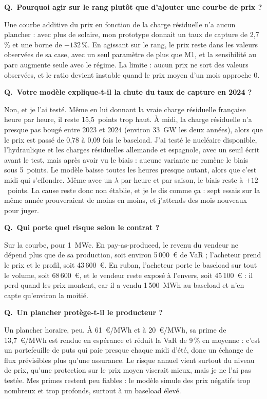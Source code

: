\documentclass[11pt,a4paper]{article}
\newcounter{qr}
\newcommand{\qr}[2]{\stepcounter{qr}\par\medskip\noindent\textbf{Q\theqr.\ #1}\par\nopagebreak\noindent #2\par}
\begin{document}
\qr{Pourquoi agir sur le rang plutôt que d'ajouter une courbe de prix ?}{Une courbe additive du prix en fonction de la charge résiduelle n'a aucun plancher : avec plus de solaire, mon prototype donnait un taux de capture de 2,7\,\% et une borne de $-132\,\%$. En agissant sur le rang, le prix reste dans les valeurs observées de sa case, avec un seul paramètre de plus que M1, et la sensibilité au parc augmente seule avec le régime. La limite : aucun prix ne sort des valeurs observées, et le ratio devient instable quand le prix moyen d'un mois approche 0.}

\qr{Votre modèle explique-t-il la chute du taux de capture en 2024 ?}{Non, et je l'ai testé. Même en lui donnant la vraie charge résiduelle française heure par heure, il reste 15,5~points trop haut. À midi, la charge résiduelle n'a presque pas bougé entre 2023 et 2024 (environ 33~GW les deux années), alors que le prix est passé de 0,78 à 0,09 fois le baseload. J'ai testé le nucléaire disponible, l'hydraulique et les charges résiduelles allemande et espagnole, avec un seuil écrit avant le test, mais après avoir vu le biais : aucune variante ne ramène le biais sous 5~points. Le modèle baisse toutes les heures presque autant, alors que c'est midi qui s'effondre. Même avec un $\lambda$ par heure et par saison, le biais reste à $+12$~points. La cause reste donc non établie, et je le dis comme ça : sept essais sur la même année prouveraient de moins en moins, et j'attends des mois nouveaux pour juger.}

\qr{Qui porte quel risque selon le contrat ?}{Sur la courbe, pour 1~MWc. En pay-as-produced, le revenu du vendeur ne dépend plus que de sa production, soit environ 5\,000~€ de VaR ; l'acheteur prend le prix et le profil, soit 43\,600~€. En ruban, l'acheteur porte le baseload sur tout le volume, soit 68\,600~€, et le vendeur reste exposé à l'envers, soit 45\,100~€ : il perd quand les prix montent, car il a vendu 1\,500~MWh au baseload et n'en capte qu'environ la moitié.}

\qr{Un plancher protège-t-il le producteur ?}{Un plancher horaire, peu. À 61~€/MWh et à 20~€/MWh, sa prime de 13,7~€/MWh est rendue en espérance et réduit la VaR de 9\,\% en moyenne : c'est un portefeuille de puts qui paie presque chaque midi d'été, donc un échange de flux prévisibles plus qu'une assurance. Le risque annuel vient surtout du niveau de prix, qu'une protection sur le prix moyen viserait mieux, mais je ne l'ai pas testée. Mes primes restent peu fiables : le modèle simule des prix négatifs trop nombreux et trop profonds, surtout à un baseload élevé.}
\end{document}
